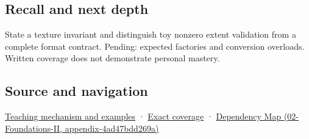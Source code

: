 \subsection{Recall and next depth}\label{appendix-7f8ec83d0886-recall-and-next-depth}

State a texture invariant and distinguish toy nonzero extent validation from a complete format contract. Pending: expected factories and conversion overloads. Written coverage does not demonstrate personal mastery.

\subsection{Source and navigation}\label{appendix-7f8ec83d0886-source-and-navigation}

\hyperref[01-foundations-i-ch003-construction-establishes-a-usable-state]{Teaching mechanism and examples} · \hyperref[appendix-fd090d982a15-m009---parts-127-147]{Exact coverage} · \href{../02-Foundations-II/main.pdf\#nameddest=appendix-4ad47bdd269a}{Dependency Map (02-Foundations-II, appendix-4ad47bdd269a)}

